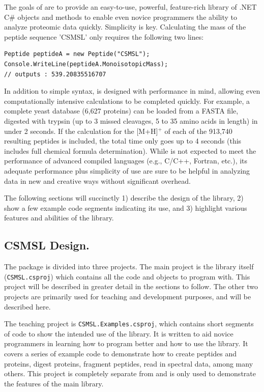 The goals of \csmsl{} are to provide an easy-to-use, powerful, feature-rich library of .NET C\# objects and methods to enable even novice programmers the ability to analyze proteomic data quickly. Simplicity is key. Calculating the mass of the peptide sequence 'CSMSL' only requires the following two lines:
\begin{lstlisting}
Peptide peptideA = new Peptide("CSMSL");
Console.WriteLine(peptideA.MonoisotopicMass);
// outputs : 539.20835516707
\end{lstlisting}
In addition to simple syntax, \csmsl{} is designed with performance in mind, allowing even computationally intensive calculations to be completed quickly. For example, a complete yeast database (6,627 proteins) can be loaded from a FASTA file, digested with trypsin (up to 3 missed cleavages, 5 to 35 amino acids in length) in under 2 seconds. If the calculation for the [M+H]$^+$ \mz{} of each of the 913,740 resulting peptides is included, the total time only goes up to 4 seconds (this includes full chemical formula determination). While \csmsl{} is not expected to meet the performance of advanced compiled languages (e.g., C/C++, Fortran, etc.), its adequate performance plus simplicity of use are sure to be helpful in analyzing data in new and creative ways without significant overhead.

The following sections will succinctly 1) describe the design of the library, 2) show a few example code segments indicating its use, and 3) highlight various features and abilities of the library.

\subsection*{CSMSL Design.}
The \csmsl{} package is divided into three projects. The main project is the library itself (\texttt{CSMSL.csproj}) which contains all the code and objects to program with. This project will be described in greater detail in the sections to follow. The other two projects are primarily used for teaching and development purposes, and will be described here. 

The teaching project is \texttt{CSMSL.Examples.csproj}, which contains short segments of code to show the intended use of the library. It is written to aid novice programmers in learning how to program better and how to use the library. It covers a series of example code to demonstrate how to create peptides and proteins, digest proteins, fragment peptides, read in spectral data, among many others. This project is completely separate from \csmsl{} and is only used to demonstrate the features of the main library. 

